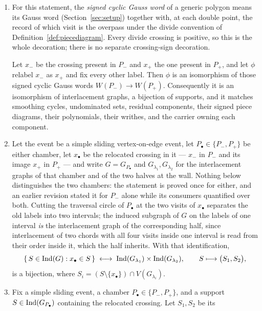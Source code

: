 \begin{lemma}
\label{lem:slidingcartesian}
\begin{enumerate}
\item[(A)] For this statement, the \emph{signed cyclic Gauss word} of a generic polygon
means its Gauss word (Section~\ref{sec:setup}) together with, at each double
point, the record of which visit is the overpass under the divide convention of
Definition~\ref{def:piecediagram}. Every divide crossing is positive, so this
is the whole decoration; there is no separate crossing-sign decoration.

Let $x_-$ be the crossing present in $P_-$ and $x_+$ the one present in $P_+$,
and let $\phi$ relabel $x_-$ as $x_+$ and fix every other label. Then $\phi$ is
an isomorphism of those signed cyclic Gauss words
$W(P_-)\to W(P_+)$. Consequently it
is an isomorphism of interlacement graphs, a bijection of supports, and it
matches smoothing cycles, undominated sets, residual components, their signed
piece diagrams, their polynomials, their writhes, and the carrier owning each
component.
\item[(B)] Let the event be a simple sliding vertex-on-edge event, let
$P_\bullet\in\{P_-,P_+\}$ be either chamber, let $x_\bullet$ be the relocated
crossing in it --- $x_-$ in $P_-$ and its image $x_+$ in $P_+$ --- and write
$G=G_{P_\bullet}$ and $G_{\lambda_1},G_{\lambda_2}$ for the interlacement graphs
of that chamber and of the two halves at the wall. Nothing below distinguishes
the two chambers: the statement is proved once for either, and an earlier
revision stated it for $P_-$ alone while its consumers quantified over both.
Cutting the traversal circle of $P_\bullet$ at the two visits of $x_\bullet$
separates the old labels into two intervals;
the induced subgraph of $G$ on the labels of one interval \emph{is} the
interlacement graph of the corresponding half, since interlacement of two chords
with all four visits inside one interval is read from their order inside it,
which the half inherits. With that identification,
\[
   \{\,S\in\operatorname{Ind}(G):x_\bullet\in S\,\}
   \;\longleftrightarrow\;
   \operatorname{Ind}(G_{\lambda_1})\times\operatorname{Ind}(G_{\lambda_2}),
   \qquad
   S\longmapsto\bigl(S_1,S_2\bigr),
\]
is a bijection, where $S_i=(S\setminus\{x_\bullet\})\cap V(G_{\lambda_i})$.
\item[(C)] Fix a simple sliding event, a chamber $P_\bullet\in\{P_-,P_+\}$, and a support
$S\in\operatorname{Ind}(G_{P_\bullet})$ containing the relocated crossing. Let $S_1,S_2$ be its

\end{enumerate}
\end{lemma}
